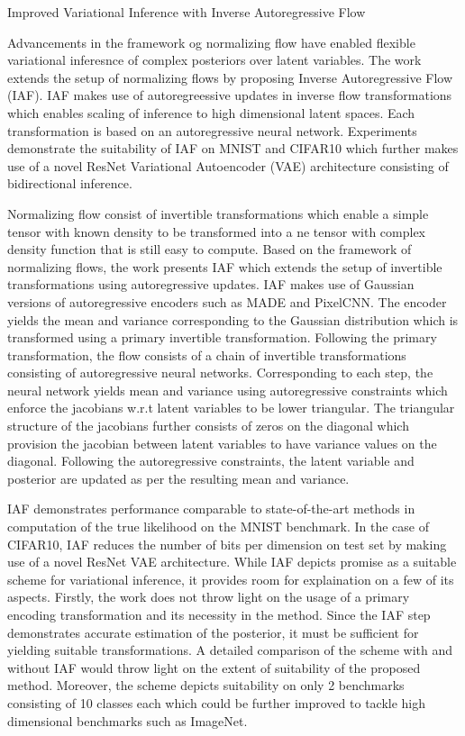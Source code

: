 \documentclass[11pt,letterpaper]{article}
\begin{document}
\begin{center}
  \large{Improved Variational Inference with Inverse Autoregressive Flow}
\end{center}
Advancements in the framework og normalizing flow have enabled flexible variational inferesnce of complex posteriors over latent variables. The work extends the setup of normalizing flows by proposing Inverse Autoregressive Flow (IAF). IAF makes use of autoregreessive updates in inverse flow transformations which enables scaling of inference to high dimensional latent spaces. Each transformation is based on an autoregressive neural network. Experiments demonstrate the suitability of IAF on MNIST and CIFAR10 which further makes use of a novel ResNet Variational Autoencoder (VAE) architecture consisting of bidirectional inference. 

Normalizing flow consist of invertible transformations which enable a simple tensor with known density to be transformed into a ne tensor with complex density function that is still easy to compute. Based on the framework of normalizing flows, the work presents IAF which extends the setup of invertible transformations using autoregressive updates. IAF makes use of Gaussian versions of autoregressive encoders such as MADE and PixelCNN. The encoder yields the mean and variance corresponding to the Gaussian distribution which is transformed using a primary invertible transformation. Following the primary transformation, the flow consists of a chain of invertible transformations consisting of autoregressive neural networks. Corresponding to each step, the neural network yields mean and variance using autoregressive constraints which enforce the jacobians w.r.t latent variables to be lower triangular. The triangular structure of the jacobians further consists of zeros on the diagonal which provision the jacobian between latent variables to have variance values on the diagonal. Following the autoregressive constraints, the latent variable and posterior are updated as per the resulting mean and variance. 

IAF demonstrates performance comparable to state-of-the-art methods in computation of the true likelihood on the MNIST benchmark. In the case of CIFAR10, IAF reduces the number of bits per dimension on test set by making use of a novel ResNet VAE architecture. While IAF depicts promise as a suitable scheme for variational inference, it provides room for explaination on a few of its aspects. Firstly, the work does not throw light on the usage of a primary encoding transformation and its necessity in the method. Since the IAF step demonstrates accurate estimation of the posterior, it must be sufficient for yielding suitable transformations. A detailed comparison of the scheme with and without IAF would throw light on the extent of suitability of the proposed method. Moreover, the scheme depicts suitability on only 2 benchmarks consisting of 10 classes each which could be further improved to tackle high dimensional benchmarks such as ImageNet.
\end{document}
